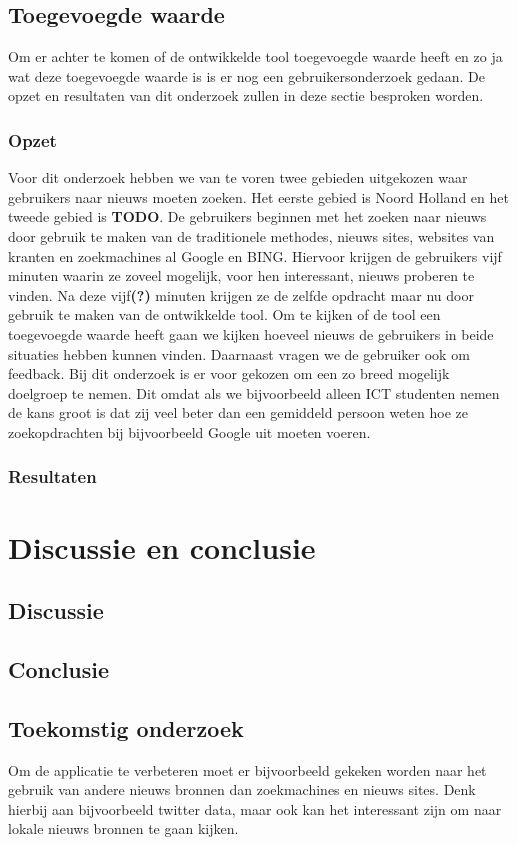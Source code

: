 \documentclass[twoside,openright]{uva-bachelor-thesis}
\begin{document}
	\section{Toegevoegde waarde}
		Om er achter te komen of de ontwikkelde tool toegevoegde waarde heeft en zo ja wat deze toegevoegde waarde is is er nog een gebruikersonderzoek gedaan. De opzet en resultaten van dit onderzoek zullen in deze sectie besproken worden.
		\subsection{Opzet}
			Voor dit onderzoek hebben we van te voren twee gebieden uitgekozen waar gebruikers naar nieuws moeten zoeken. Het eerste gebied is Noord Holland en het tweede gebied is \textbf{TODO}. De gebruikers beginnen met het zoeken naar nieuws door gebruik te maken van de traditionele methodes, nieuws sites, websites van kranten en zoekmachines al Google en BING. Hiervoor krijgen de gebruikers vijf minuten waarin ze zoveel mogelijk, voor hen interessant, nieuws proberen te vinden. Na deze vijf\textbf{(?)} minuten krijgen ze de zelfde opdracht maar nu door gebruik te maken van de ontwikkelde tool. Om te kijken of de tool een toegevoegde waarde heeft gaan we kijken hoeveel nieuws de gebruikers in beide situaties hebben kunnen vinden. Daarnaast vragen we de gebruiker ook om feedback. Bij dit onderzoek is er voor gekozen om een zo breed mogelijk doelgroep te nemen. Dit omdat als we bijvoorbeeld alleen ICT studenten nemen de kans groot is dat zij veel beter dan een gemiddeld persoon weten hoe ze zoekopdrachten bij bijvoorbeeld Google uit moeten voeren.
		\subsection{Resultaten}
	
\chapter{Discussie en conclusie}
	\section{Discussie}
	\section{Conclusie}
	\section{Toekomstig onderzoek}
		Om de applicatie te verbeteren moet er bijvoorbeeld gekeken worden naar het gebruik van andere nieuws bronnen dan zoekmachines en nieuws sites. Denk hierbij aan bijvoorbeeld twitter data, maar ook kan het interessant zijn om naar lokale nieuws bronnen te gaan kijken.
\end{document}
